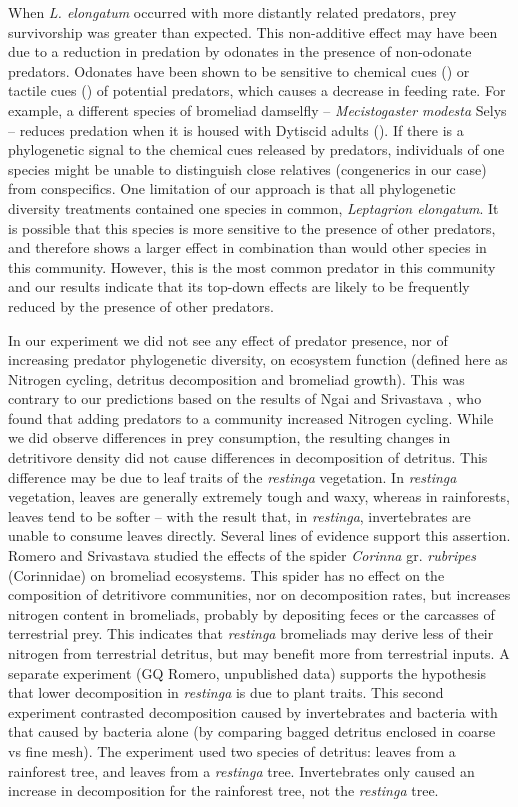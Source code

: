\documentclass[11pt]{article}
\begin{document}
When \emph{L. elongatum} occurred with more distantly related predators,
prey survivorship was greater than expected. This non-additive effect
may have been due to a reduction in predation by odonates in the
presence of non-odonate predators. Odonates have been shown to be
sensitive to chemical cues (\citealt{Barry2014}) or tactile cues
(\citealt{Atwood2014}) of potential predators, which causes a decrease in
feeding rate. For example, a different species of bromeliad damselfly --
\emph{Mecistogaster modesta} Selys -- reduces predation when it is
housed with Dytiscid adults (\citealt{Atwood2014}). If there is a
phylogenetic signal to the chemical cues released by predators,
individuals of one species might be unable to distinguish close
relatives (congenerics in our case) from conspecifics. One limitation of
our approach is that all phylogenetic diversity treatments contained one
species in common, \emph{Leptagrion elongatum}. It is possible that this
species is more sensitive to the presence of other predators, and
therefore shows a larger effect in combination than would other species
in this community. However, this is the most common predator in this
community and our results indicate that its top-down effects are likely
to be frequently reduced by the presence of other predators.

In our experiment we did not see any effect of predator presence, nor of
increasing predator phylogenetic diversity, on ecosystem function
(defined here as Nitrogen cycling, detritus decomposition and bromeliad
growth). This was contrary to our predictions based on the results of
Ngai and Srivastava \citeyearpar{Ngai2006}, who found that adding
predators to a community increased Nitrogen cycling. While we did
observe differences in prey consumption, the resulting changes in
detritivore density did not cause differences in decomposition of
detritus. This difference may be due to leaf traits of the
\emph{restinga} vegetation. In \emph{restinga} vegetation, leaves are
generally extremely tough and waxy, whereas in rainforests, leaves tend
to be softer -- with the result that, in \emph{restinga}, invertebrates
are unable to consume leaves directly. Several lines of evidence support
this assertion. Romero and Srivastava \citeyearpar{Romero2010} studied
the effects of the spider \emph{Corinna} gr. \emph{rubripes}
(Corinnidae) on bromeliad ecosystems. This spider has no effect on the
composition of detritivore communities, nor on decomposition rates, but
increases nitrogen content in bromeliads, probably by depositing feces
or the carcasses of terrestrial prey. This indicates that
\emph{restinga} bromeliads may derive less of their nitrogen from
terrestrial detritus, but may benefit more from terrestrial inputs. A
separate experiment (GQ Romero, unpublished data) supports the hypothesis that
lower decomposition in \emph{restinga} is due to plant traits. This
second experiment contrasted decomposition caused by invertebrates and
bacteria with that caused by bacteria alone (by comparing bagged
detritus enclosed in coarse vs fine mesh). The experiment used two
species of detritus: leaves from a rainforest tree, and leaves from a
\emph{restinga} tree. Invertebrates only caused an increase in
decomposition for the rainforest tree, not the \emph{restinga} tree.
\end{document}
